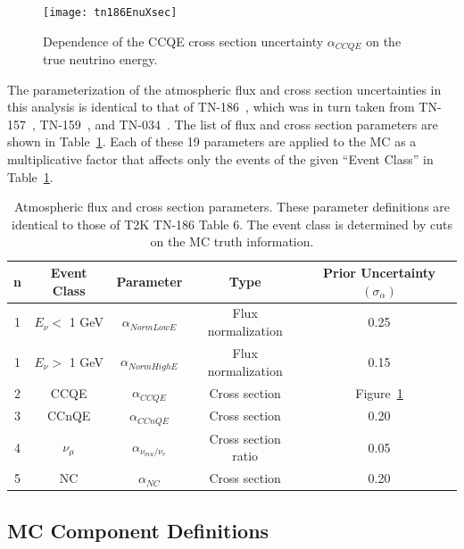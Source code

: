 \begin{figure}[h]
  \begin{center}
    \texttt{[image: tn186EnuXsec]}
  \end{center}
  \caption{Dependence of the CCQE cross section uncertainty $\alpha_{CCQE}$ on
  the true neutrino energy.}
  \label{fig:alphaccqe}
\end{figure}

The parameterization of the atmospheric flux and cross section uncertainties in
this analysis is identical to that of TN-186~\cite{tn186}, which was in turn taken from
TN-157~\cite{tn157}, TN-159~\cite{tn159}, and TN-034~\cite{tn034}. The list of
flux and cross section parameters are shown in Table~\ref{tab:alpha}.  Each of
these 19 parameters are applied to the MC as a multiplicative factor that
affects only the events of the given ``Event Class'' in Table~\ref{tab:alpha}.

\begin{table}
  \centering
  \begin{tabular}{c c | c | c | c }
    \hline\hline
    n & Event Class & Parameter & Type & Prior Uncertainty $(\sigma_{\alpha})$ \\
    \hline 
    1 & $E_{\nu} <$ 1 GeV & $\alpha_{NormLowE}$ & Flux normalization & 0.25 \\
    1 & $E_{\nu} >$ 1 GeV & $\alpha_{NormHighE}$ & Flux normalization & 0.15 \\
    2 & CCQE & $\alpha_{CCQE}$ & Cross section & Figure~\ref{fig:alphaccqe} \\
    3 & CCnQE & $\alpha_{CCnQE}$ & Cross section & 0.20 \\
    4 & $\nu_{\mu}$ & $\alpha_{\nu_{mu}/\nu_{e}}$ & Cross section ratio & 0.05 \\
    5 & NC & $\alpha_{NC}$ & Cross section & 0.20 \\
    \hline\hline
  \end{tabular}
  \caption{Atmospheric flux and cross section parameters.  These parameter
  definitions are identical to those of T2K TN-186 Table 6. The event class is
  determined by cuts on the MC truth information.}
  \label{tab:alpha}
\end{table}




\subsection{MC Component Definitions}
\label{subsec:components}

